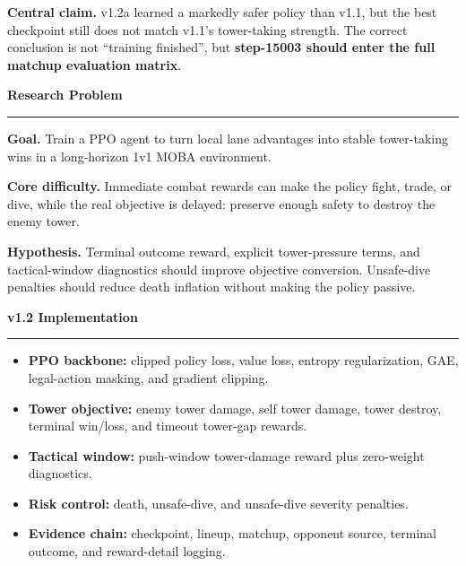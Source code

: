 \documentclass[final]{article}
\newcommand{\BlockTitle}[1]{%
  {\fontsize{35}{41}\selectfont\bfseries\color{ink}#1}\par
  \vspace{0.26cm}
  {\color{rule}\rule{\linewidth}{1.9pt}}\par
  \vspace{0.62cm}
}
\newcommand{\PosterBlock}[2]{%
  \begin{minipage}[t]{\linewidth}
    \BlockTitle{#1}
    {\fontsize{24}{31}\selectfont\color{ink}\RaggedRight #2}
  \end{minipage}
}
\begin{document}
\vspace*{29.0cm}
\hspace*{4.8cm}
\begin{minipage}[t]{70.4cm}

{\fontsize{26}{33}\selectfont\color{ink}\RaggedRight
\textbf{Central claim.} v1.2a learned a markedly safer policy than v1.1, but the best checkpoint still does not match v1.1's tower-taking strength. The correct conclusion is not ``training finished'', but \textbf{step-15003 should enter the full matchup evaluation matrix}.}

\vspace{1.7cm}

\begin{minipage}[t]{21.8cm}
\PosterBlock{Research Problem}{
\textbf{Goal.} Train a PPO agent to turn local lane advantages into stable tower-taking wins in a long-horizon 1v1 MOBA environment.

\vspace{0.72cm}
\textbf{Core difficulty.} Immediate combat rewards can make the policy fight, trade, or dive, while the real objective is delayed: preserve enough safety to destroy the enemy tower.

\vspace{0.72cm}
\textbf{Hypothesis.} Terminal outcome reward, explicit tower-pressure terms, and tactical-window diagnostics should improve objective conversion. Unsafe-dive penalties should reduce death inflation without making the policy passive.
}

\vspace{2.05cm}

\PosterBlock{v1.2 Implementation}{
\begin{itemize}
  \item \textbf{PPO backbone:} clipped policy loss, value loss, entropy regularization, GAE, legal-action masking, and gradient clipping.
  \item \textbf{Tower objective:} enemy tower damage, self tower damage, tower destroy, terminal win/loss, and timeout tower-gap rewards.
  \item \textbf{Tactical window:} push-window tower-damage reward plus zero-weight diagnostics.
  \item \textbf{Risk control:} death, unsafe-dive, and unsafe-dive severity penalties.
  \item \textbf{Evidence chain:} checkpoint, lineup, matchup, opponent source, terminal outcome, and reward-detail logging.
\end{itemize}

}
\end{minipage}
\end{minipage}
\end{document}
